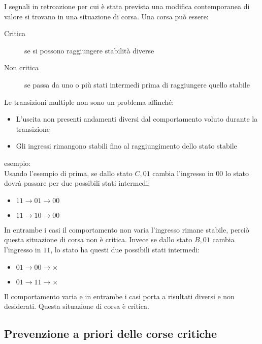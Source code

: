 \documentclass{subfiles}
\begin{document}
I segnali in retroazione per cui è stata prevista una modifica contemporanea di valore si trovano in una situazione di corsa.
Una corsa può essere:

\begin{description}
    \item[Critica] se si possono raggiungere stabilità diverse
    \item[Non critica] se passa da uno o più stati intermedi prima di raggiungere quello stabile
\end{description}

\noindent
Le transizioni multiple non sono un problema affinché:

\begin{itemize}
    \item L'uscita non presenti andamenti diversi dal comportamento voluto durante la transizione
    \item Gli ingressi rimangono stabili fino al raggiungimento dello stato stabile
\end{itemize}

\noindent
esempio:\\

\noindent
Usando l'esempio di prima, se dallo stato $C,01$ cambia l'ingresso in $00$ lo stato dovrà passare per due possibili stati intermedi:

\begin{itemize}
\item $11 \to 01 \to 00$
\item $11 \to 10 \to 00$
\end{itemize}

\noindent
In entrambe i casi il comportamento non varia l'ingresso rimane stabile, perciò questa situazione di corsa non è critica.
Invece se dallo stato $B,01$ cambia l'ingresso in $11$, lo stato ha questi due possibili stati intermedi:

\begin{itemize}
\item $01 \to 00 \to \times$
\item $01 \to 11 \to \times$
\end{itemize}

\noindent
Il comportamento varia e in entrambe i casi porta a risultati diversi e non desiderati.
Questa situazione di corsa è critica.

\subsection{Prevenzione a priori delle corse critiche}
\end{document}
